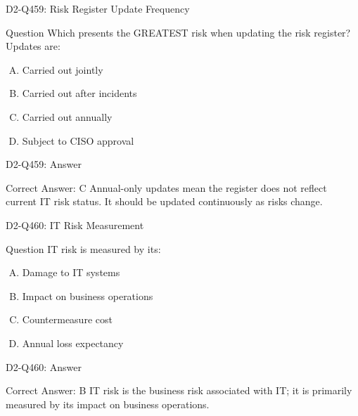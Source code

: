 \documentclass{beamer}
\begin{document}
\begin{frame}{D2-Q459: Risk Register Update Frequency}
	\begin{block}{Question}
		Which presents the GREATEST risk when updating the risk register? Updates are:
	\end{block}
	\begin{enumerate}[(A)]
		\item Carried out jointly
		\item Carried out after incidents
		\item Carried out annually
		\item Subject to CISO approval
	\end{enumerate}
\end{frame}
\begin{frame}{D2-Q459: Answer}
	\begin{block}{Correct Answer: C}
		Annual-only updates mean the register does not reflect current IT risk status. It should be updated continuously as risks change.
	\end{block}
\end{frame}

\begin{frame}{D2-Q460: IT Risk Measurement}
	\begin{block}{Question}
		IT risk is measured by its:
	\end{block}
	\begin{enumerate}[(A)]
		\item Damage to IT systems
		\item Impact on business operations
		\item Countermeasure cost
		\item Annual loss expectancy
	\end{enumerate}
\end{frame}
\begin{frame}{D2-Q460: Answer}
	\begin{block}{Correct Answer: B}
		IT risk is the business risk associated with IT; it is primarily measured by its impact on business operations.
	\end{block}
\end{frame}
\end{document}
